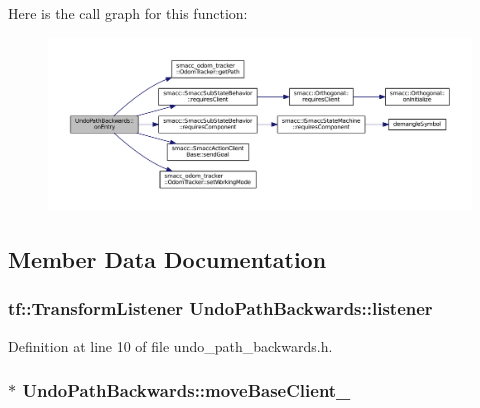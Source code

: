 Here is the call graph for this function\+:
\nopagebreak
\begin{figure}[H]
\begin{center}
\leavevmode
\includegraphics[width=350pt]{classUndoPathBackwards_a073a69a9e7b89d38faaab47096df292c_cgraph}
\end{center}
\end{figure}




\subsection{Member Data Documentation}
\subsubsection[{\texorpdfstring{listener}{listener}}]{\setlength{\rightskip}{0pt plus 5cm}tf\+::\+Transform\+Listener Undo\+Path\+Backwards\+::listener\hspace{0.3cm}{\ttfamily [private]}}\hypertarget{classUndoPathBackwards_a482530dc30c268b6c5298b78abfe9d8b}{}\label{classUndoPathBackwards_a482530dc30c268b6c5298b78abfe9d8b}


Definition at line 10 of file undo\+\_\+path\+\_\+backwards.\+h.

\subsubsection[{\texorpdfstring{move\+Base\+Client\+\_\+}{moveBaseClient_}}]{$\ast$ Undo\+Path\+Backwards\+::move\+Base\+Client\+\_\+\hspace{0.3cm}{\ttfamily [private]}}\hypertarget{classUndoPathBackwards_ac9b783f5d06850fe1c3f03bb1308ca2f}{}\label{classUndoPathBackwards_ac9b783f5d06850fe1c3f03bb1308ca2f}


